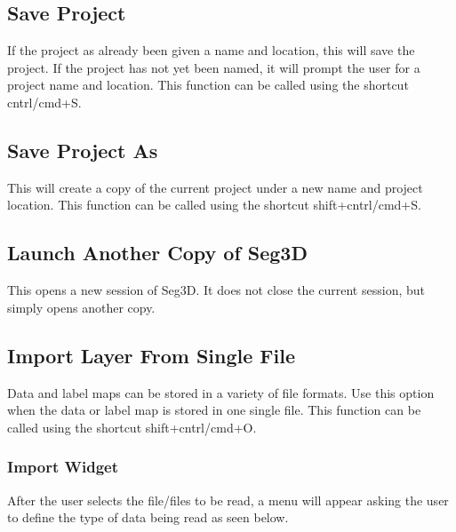 \documentclass[fleqn,11pt,openany]{book}
\begin{document}
\subsection{Save Project}
If the project as already been given a name and location, this will save the project.  If the project has not yet been named, it will prompt the user for a project name and location.  This function can be called using the shortcut cntrl/cmd+S.

\subsection{Save Project As}
This will create a copy of the current project under a new name and project location.  This function can be called using the shortcut shift+cntrl/cmd+S.

\subsection{Launch Another Copy of Seg3D}
This opens a new session of Seg3D.  It does not close the current session, but simply opens another copy.

\subsection{Import Layer From Single File}
Data and label maps can be stored in a variety of file formats.  Use this option when the data or label map is stored in one single file.  This function can be called using the shortcut shift+cntrl/cmd+O.

\subsubsection{Import Widget}
After the user selects the file/files to be read, a menu will appear asking the user to define the type of data being read as seen below.
\end{document}
